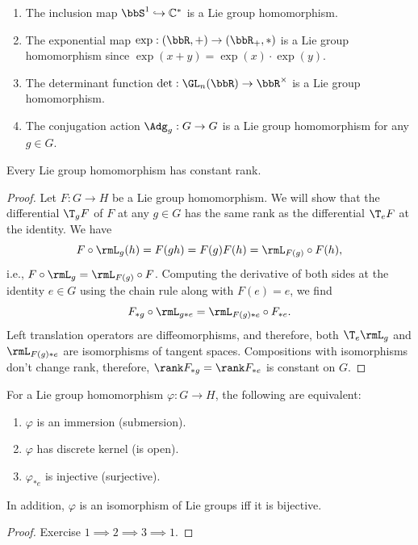 \begin{example}
    \begin{enumerate}[label=(\alph*)]
        \item The inclusion map $\bbS^1\hookrightarrow \mathbb{C}^\ast$ is a Lie group homomorphism.
        \item The exponential map $\exp:(\bbR ,+)\to (\bbR_+,*)$ is a Lie group homomorphism since $\exp(x+y)=\exp(x)\cdot \exp(y)$.
        \item The determinant function $\det:\GL_n(\bbR )\to \bbR^\times$ is a Lie group homomorphism.
        \item The conjugation action $\Adg_g:G\to G$ is a Lie group homomorphism for any $g\in G$.
    \end{enumerate}
\end{example}

\begin{thm}
    Every Lie group homomorphism has constant rank.
\end{thm}
\begin{proof}
    Let $F:G\to H$ be a Lie group homomorphism. We will show that the differential $\T_g F$ of $F$ at any $g\in G$ has the same rank as the differential $\T_eF$ at the identity. We have
    \[F\circ \rmL_g (h)=F(gh)=F(g)F(h)=\rmL_{F(g)}\circ F(h),\]
    i.e., $F\circ \rmL_g=\rmL_{F(g)}\circ F$. Computing the derivative of both sides at the identity $e\in G$ using the chain rule along with $F(e)=e$, we find
    \[F_{\ast g}\circ \rmL_{g\ast e}=\rmL_{F(g)\ast e}\circ F_{\ast e}.\]
    Left translation operators are diffeomorphisms, and therefore, both $\T_e \rmL_g$ and $\rmL_{F(g)\ast e}$ are isomorphisms of tangent spaces. Compositions with isomorphisms don't change rank, therefore, $\rank F_{\ast g}=\rank F_{\ast e}$ is constant on $G$.
\end{proof}
\begin{cor}[{{\cite[Cor.~5.3.7]{RS1}}}]\label{cor 5.3.7 RS1}
    For a Lie group homomorphism $\varphi:G\to H$, the following are equivalent:
    \begin{enumerate}
        \item $\varphi$ is an immersion (submersion).
        \item $\varphi$ has discrete kernel (is open).
        \item $\varphi_{\ast e}$ is injective (surjective).
    \end{enumerate}
    In addition, $\varphi$ is an isomorphism of Lie groups iff it is bijective.
\end{cor}
\begin{proof}
    Exercise $1\implies 2\implies 3 \implies 1$.
\end{proof}

